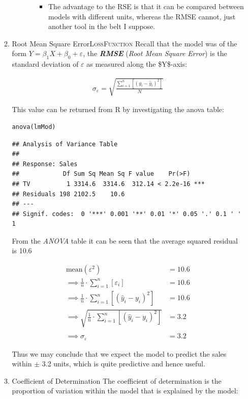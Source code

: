 \documentclass[11pt]{article}
\begin{document}
\begin{enumerate}
\begin{enumerate}
\begin{itemize}
\begin{itemize}
\begin{itemize}
\item The advantage to the RSE is that it can be compared between models
with different units, whereas the RMSE cannot, just another tool
in the belt I suppose.
\end{itemize}
\end{itemize}
\end{itemize}
\item Root Mean Square Error\hfill{}\textsc{LossFunction}
\label{sec:orge202012}
Recall that the model was of the form
\(Y = \beta_1 X + \beta_0 + \varepsilon\), the \textbf{\emph{RMSE}} (\emph{Root Mean Square
Error}) is the standard deviation of \(\varepsilon\) as measured along the
\$Y\$-axis:

\begin{align}
 \sigma_{\varepsilon} =  \sqrt{\frac{\sum^{n}_{i= 1}   \left[ \left( y_i - \hat{y}_i \right)^2 \right]}{N}}
\end{align}

This value can be returned from R by investigating the anova table:

\begin{verbatim}
anova(lmMod)
\end{verbatim}

\begin{verbatim}
## Analysis of Variance Table
##
## Response: Sales
##            Df Sum Sq Mean Sq F value    Pr(>F)
## TV          1 3314.6  3314.6  312.14 < 2.2e-16 ***
## Residuals 198 2102.5    10.6
## ---
## Signif. codes:  0 '***' 0.001 '**' 0.01 '*' 0.05 '.' 0.1 ' ' 1
\end{verbatim}

From the \emph{ANOVA} table it can be seen that the average squared residual
is 10.6

\begin{align}
\text{mean}\left( \varepsilon^2\right) &= 10.6\\
\implies \frac{1}{n} \cdot \sum^{n}_{i=1} \left[ \varepsilon_i \right] & =10.6\\
\implies \frac{1}{n} \cdot \sum^{n}_{i=1} \left[ \left( \hat{y}_i - y_i \right)^2 \right] & =10.6\\
\implies \sqrt{\frac{1}{n} \cdot \sum^{n}_{i=1} \left[ \left( \hat{y}_i - y_i \right)^2 \right] } & = 3.2\\
\ \\
\implies \sigma_{\varepsilon} &= 3.2
\end{align}

Thus we may conclude that we expect the model to predict the sales
within \(\pm\) 3.2 units, which is quite predictive and hence useful.
\item Coefficient of Determination
\label{sec:orgd6856d0}
The coefficient of determination is the proportion of variation within
the model that is explained by the model:


\end{enumerate}
\end{enumerate}
\end{document}
